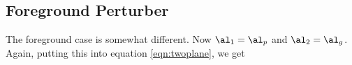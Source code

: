 \subsection{Foreground Perturber}\label{subsec:foreground}
The foreground case is somewhat different. Now $\al_1 = \al_p$ and $\al_2 = \al_g$. Again, putting this into equation \ref{eqn:twoplane}, we get
  